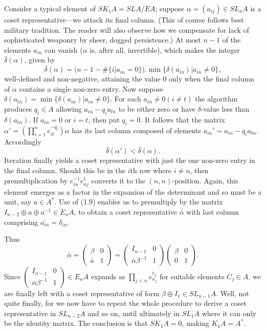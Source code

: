 \documentclass[openany,leqno]{book}  %
\begin{document}
Consider a typical element of $SK_1A=SLA/EA$; suppose $\alpha=(a_{ij})\in SL_nA$ is a coset representative---we attack its final column. (This of course follows best military tradition. The reader will also observe how we compensate for lack of sophisticated weaponry by sheer, dogged persistence.) At most $n-1$ of the elements $a_{in}$ can vanish ($\alpha$ is, after all, invertible), which makes the integer $\bar{\delta}(\alpha)$, given by
\[\bar{\delta}(\alpha)=(n-1-\#\{i|a_{in}=0\}).\min\{\delta(a_{in})|a_{in}\neq 0\},\]
well-defined and non-negative, attaining the value $0$ only when the final column of $\alpha$ contains a single non-zero entry. Now suppose $\delta(a_{tn})=\min \{\delta(a_{in})|a_{in}\neq 0\}$. For each $a_{in}\neq 0 (i\neq t)$ the algorithm produces $q_i\in A$ allowing $a_{in}-q_ia_{tn}$ to be either zero or have $\delta$-value less than $\delta(a_{tn})$. If $a_{in}=0$ or $i=t$, then put $q_i=0$. It follows that the matrix $\alpha'=(\prod_{i=1}^n e_{it}^{-q_i})\alpha$ has its last column composed of elements $a_{in}'=a_{in}-q_ia_{tn}$. Accordingly
\[\bar{\delta}(\alpha')< \bar{\delta}(\alpha).\]
Iteration finally yields a coset representative with just the one non-zero entry in the final column. Should this be in the $i$th row where $i\neq n$, then premultiplication by $e_{in}^{-1}e_{nj}^1$ converts it to the $(n,n)$-position. Again, this element emerges as a factor in the expansion of the determinant and so must be a unit, say $a\in A^*$. Use of (1.9) enables us to premultiply by the matrix $I_{n-2}\oplus a\oplus a^{-1}\in E_nA$, to obtain a coset representative $\bar{\alpha}$ with last column comprising $\bar{a_{in}}=\delta_{in}$.

Thus
\[\bar{\alpha}=\begin{pmatrix} \beta & 0 \\ \bar{a} &  1 \end{pmatrix}=\begin{pmatrix} I_{n-1} & 0 \\ \bar{\alpha}\beta^{-1} &  1 \end{pmatrix}\begin{pmatrix} \beta & 0 \\ 0 &  1 \end{pmatrix}.\]
Since $\begin{pmatrix} I_{n-1} & 0 \\ \bar{\alpha}\beta^{-1} &  1 \end{pmatrix}\in E_n A$ expands as $\prod_{j<n}e_{n_j}^{c_j}$ for suitable elements $C_j\in A$, we are finally left with a coset representative of form $\beta \oplus I_1 \in SL_{n-1}A$. Well, not quite finally, for we now have to repeat the whole procedure to derive a coset representative in $SL_{n-2} A$ and so on, until ultimately in $SL_1A$ where it can only be the identity matrix. The conclusion is that $SK_1A=0$, making $K_1A=A^*$.
\end{document}

